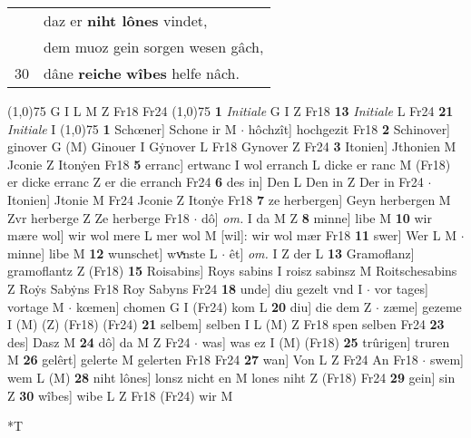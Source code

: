 \documentclass[8pt,a4paper,notitlepage]{article}
\begin{document}
\begin{table}[ht]
\begin{minipage}[t]{0.5\linewidth}
\begin{tabular}{rl}
 & daz er \textbf{niht lônes} vindet,\\ 
 & dem muoz gein sorgen wesen gâch,\\ 
30 & dâne \textbf{reiche} \textbf{wîbes} helfe nâch.\\ 
\end{tabular}
\scriptsize
\line(1,0){75} \newline
G I L M Z Fr18 Fr24 \newline
\line(1,0){75} \newline
\textbf{1} \textit{Initiale} G I Z Fr18  \textbf{13} \textit{Initiale} L Fr24  \textbf{21} \textit{Initiale} I  \newline
\line(1,0){75} \newline
\textbf{1} Schœner] Schone ir M  $\cdot$ hôchzît] hochgezit Fr18 \textbf{2} Schinover] ginover G (M) Ginouer I Gẏnover L Fr18 Gynover Z Fr24 \textbf{3} Itonien] Jthonien M Jconie Z Itonẏen Fr18 \textbf{5} erranc] ertwanc I wol erranch L dicke er ranc M (Fr18) er dicke erranc Z er die erranch Fr24 \textbf{6} des in] Den L Den in Z Der in Fr24  $\cdot$ Itonien] Jtonie M Fr24 Jconie Z Itonẏe Fr18 \textbf{7} ze herbergen] Geyn herbergen M Zvr herberge Z Ze herberge Fr18  $\cdot$ dô] \textit{om.} I da M Z \textbf{8} minne] libe M \textbf{10} wir mære wol] wir wol mere L mer wol M [wil]: wir wol mær Fr18 \textbf{11} swer] Wer L M  $\cdot$ minne] libe M \textbf{12} wunschet] wvͯnste L  $\cdot$ êt] \textit{om.} I Z der L \textbf{13} Gramoflanz] gramoflantz Z (Fr18) \textbf{15} Roisabins] Roys sabins I roisz sabinsz M Roitschesabins Z Roẏs Sabẏns Fr18 Roy Sabyns Fr24 \textbf{18} unde] diu gezelt vnd I  $\cdot$ vor tages] vortage M  $\cdot$ kœmen] chomen G I (Fr24) kom L \textbf{20} diu] die dem Z  $\cdot$ zæme] gezeme I (M) (Z) (Fr18) (Fr24) \textbf{21} selbem] selben I L (M) Z Fr18 spen selben Fr24 \textbf{23} des] Dasz M \textbf{24} dô] da M Z Fr24  $\cdot$ was] was ez I (M) (Fr18) \textbf{25} trûrigen] truren M \textbf{26} gelêrt] gelerte M gelerten Fr18 Fr24 \textbf{27} wan] Von L Z Fr24 An Fr18  $\cdot$ swem] wem L (M) \textbf{28} niht lônes] lonsz nicht en M lones niht Z (Fr18) Fr24 \textbf{29} gein] sin Z \textbf{30} wîbes] wibe L Z Fr18 (Fr24) wir M \newline
\end{minipage}
\hspace{0.5cm}
\begin{minipage}[t]{0.5\linewidth}
\small
\begin{center}*T
\end{center}
\begin{tabular}{rl}

\end{tabular}
\end{minipage}
\end{table}
\end{document}
